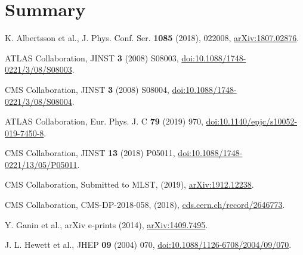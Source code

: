 \documentclass{webofc}
\begin{document}
\section{Summary}
\label{Summary}


\clearpage

\begin{thebibliography}{}
 K. Albertsson et al., J. Phys. Conf. Ser. \textbf{1085} (2018), 022008, \href{http://www.arxiv.org/abs/1807.02876}{arXiv:1807.02876}.

 ATLAS Collaboration, JINST \textbf{3} (2008) S08003, \href{http://dx.doi.org/10.1088/1748-0221/3/08/S08003}{doi:10.1088/1748-0221/3/08/S08003}.

  CMS Collaboration, JINST \textbf{3} (2008) S08004,
\href{http://dx.doi.org/10.1088/1748-0221/3/08/S08004}{doi:10.1088/1748-0221/3/08/S08004}.

 ATLAS Collaboration, Eur. Phys. J. C \textbf{79} (2019) 970, \href{http://dx.doi.org/10.1140/epjc/s10052-019-7450-8}{doi:10.1140/epjc/s10052-019-7450-8}.

 CMS Collaboration, JINST \textbf{13} (2018) P05011,
\href{http://dx.doi.org/10.1088/1748-0221/13/05/P05011}{doi:10.1088/1748-0221/13/05/P05011}.

 CMS Collaboration, Submitted to MLST, (2019), \href{https://arxiv.org/abs/1912.12238}{arXiv:1912.12238}.

 CMS Collaboration, CMS-DP-2018-058, (2018), \href{https://cds.cern.ch/record/2646773}{cds.cern.ch/record/2646773}.

 Y. Ganin et al., arXiv e-prints (2014), \href{https://arxiv.org/abs/1409.7495}{arXiv:1409.7495}.

 J. L. Hewett et al., JHEP \textbf{09} (2004) 070, \href{http://dx.doi.org/10.1088/1126-6708/2004/09/070}{doi:10.1088/1126-6708/2004/09/070}.


\end{thebibliography}
\end{document}
